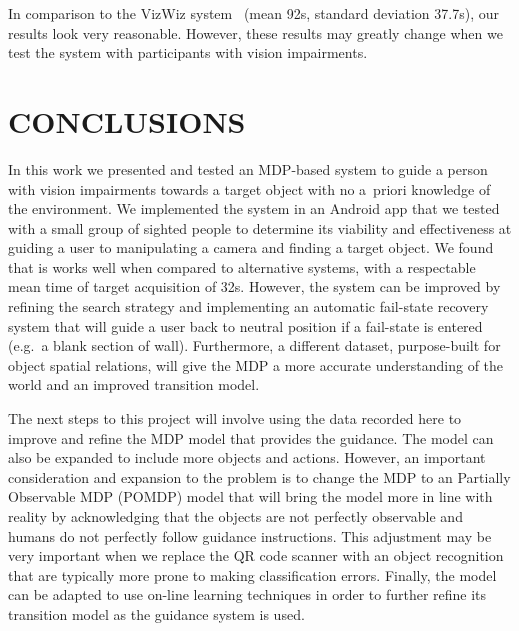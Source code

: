 \documentclass[a4paper, twoside]{article}
\begin{document}
In comparison to the VizWiz system~\cite{bigham2010vizwiz} (mean 92s, standard deviation 37.7s), our results look very reasonable. However, these results may greatly change when we test the system with participants with vision impairments.

\section{\uppercase{Conclusions}}\label{sec:conclusion}

\noindent In this work we presented and tested an MDP-based system to guide a person with vision impairments towards a target object with no a~priori knowledge of the environment. We implemented the system in an Android app that we tested with a small group of sighted people to determine its viability and effectiveness at guiding a user to manipulating a camera and finding a target object. We found that is works well when compared to alternative systems, with a respectable mean time of target acquisition of 32s. However, the system can be improved by refining the search strategy and implementing an automatic fail-state recovery system that will guide a user back to neutral position if a fail-state is entered (e.g.\ a blank section of wall). Furthermore, a different dataset, purpose-built for object spatial relations, will give the MDP a more accurate understanding of the world and an improved transition model.

The next steps to this project will involve using the data recorded here to improve and refine the MDP model that provides the guidance. The model can also be expanded to include more objects and actions. However, an important consideration and expansion to the problem is to change the MDP to an Partially Observable MDP (POMDP) model that will bring the model more in line with reality by acknowledging that the objects are not perfectly observable and humans do not perfectly follow guidance instructions. This adjustment may be very important when we replace the QR code scanner with an object recognition that are typically more prone to making classification errors. Finally, the model can be adapted to use on-line learning techniques in order to further refine its transition model as the guidance system is used.  

\balance


{\small
}
\end{document}
